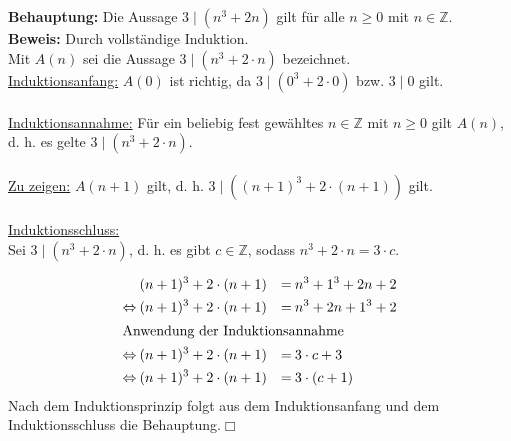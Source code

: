 \documentclass[10pt,a4paper,oneside,ngerman,numbers=noenddot]{scrartcl}
\begin{document}
\subsection{}
\textbf{Behauptung:} Die Aussage $3 \mid (n^{3} + 2n)$ gilt für alle $n \geq 0$ mit $n \in \mathbb{Z}$.\\
\textbf{Beweis:} Durch vollständige Induktion.\\
Mit $A(n)$ sei die Aussage $3 \mid (n^{3} + 2 \cdot n)$ bezeichnet.\\
\underline{Induktionsanfang:} $A(0)$ ist richtig, da $3 \mid (0^{3} + 2 \cdot 0)$ bzw. $3 \mid 0$ gilt.\\\\
\underline{Induktionsannahme:} Für ein beliebig fest gewähltes $n \in \mathbb{Z}$ mit $n \geq 0$ gilt $A(n)$, d. h. es gelte $3 \mid (n^{3} + 2 \cdot n)$.\\\\
\underline{Zu zeigen:} $A(n+1)$ gilt, d. h. $3 \mid ((n+1)^{3} + 2 \cdot (n+1))$ gilt.\\\\
\underline{Induktionsschluss:}\\
Sei $3 \mid (n^{3} + 2 \cdot n)$, d. h. es gibt $c \in \mathbb{Z}$, sodass $n^3 + 2 \cdot n = 3 \cdot c$.

\begin{alignat}{2}
 &\: (n+1)^{3} + 2 \cdot (n+1) &=&\: n^{3} + 1^{3} + 2n + 2\\
\Leftrightarrow &\: (n+1)^{3} + 2 \cdot (n+1) &=&\: n^{3} + 2n + 1^{3} + 2\\
\intertext{Anwendung der Induktionsannahme}
\Leftrightarrow &\: (n+1)^{3} + 2 \cdot (n+1) &=&\: 3 \cdot c + 3\\
\Leftrightarrow &\: (n+1)^{3} + 2 \cdot (n+1) &=&\: 3 \cdot (c + 1)
\end{alignat}
Nach dem Induktionsprinzip folgt aus dem Induktionsanfang und dem Induktionsschluss die Behauptung.\hfill $\Box$
\end{document}
